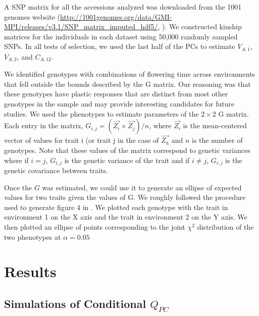 \documentclass[11pt,letterpaper]{article}
\begin{document}
A SNP matrix for all the accessions analyzed was downloaded from the 1001 genomes website (\url{http://1001genomes.org/data/GMI-MPI/releases/v3.1/SNP_matrix_imputed_hdf5/}, \cite{alonso20161}). 
We constructed kinship matrices for the individuals in each dataset using 50,000 randomly sampled SNPs.
In all tests of selection, we used the last half of the PCs to estimate $V_{A,1}$, $V_{A,2}$, and $C_{A,12}$.

We identified genotypes with combinations of flowering time across environments that fell outside the bounds described by the G matrix.
Our reasoning was that these genotypes have plastic responses that are distinct from most other genotypes in the sample and may provide interesting candidates for future studies.
We used the phenotypes to estimate parameters of the $2\times 2$ G matrix. Each entry in the matrix, $G_{i,j} = (\vec{Z_i} \times \vec{Z_j})/n$, where $\vec{Z_i}$ is the mean-centered vector of values for trait i (or trait j in the case of $\vec{Z_h}$ and $n$ is the number of genotypes. 
Note that these values of the matrix correspond to genetic variances where if $i=j$, $G_{i,j}$ is the genetic variance of the trait and if $i \neq j$, $G_{i,j}$ is the genetic covariance between traits.

Once the $G$ was estimated, we could use it to generate an ellipse of expected values for two traits given the values of G. 
We roughly followed the procedure used to generate figure 4 in \cite{machado2023rules}.
We plotted each genotype with the trait in environment 1 on the X axis and the trait in environment 2 on the Y axis.
We then plotted an ellipse of points corresponding to the joint $\chi ^2$ distribution of the two phenotypes at $\alpha = 0.05$


\section*{Results}

\subsection*{Simulations of Conditional $Q_{PC}$}
\end{document}
